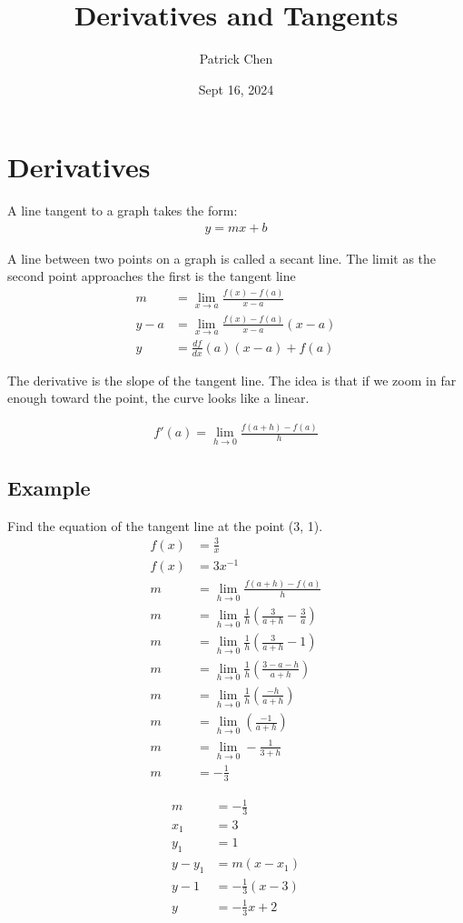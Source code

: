 \documentclass{article}
\title{Derivatives and Tangents}
\author{Patrick Chen}
\date{Sept 16, 2024}
\theoremstyle{mytheoremstyle}
\theoremstyle{mytheoremstyle}
\theoremstyle{myproblemstyle}
\begin{document}
    \maketitle
    \section*{Derivatives}
    A line tangent to a graph takes the form:
    \begin{align*}
        y = mx + b
    \end{align*}

    A line between two points on a graph is called a secant line. The limit as
    the second point approaches the first is the tangent line
    \begin{align*}
        m   &= \lim_{x\to a} \frac{f(x)-f(a)}{x-a} \\
        y-a &= \lim_{x\to a} \frac{f(x)-f(a)}{x-a} (x-a) \\
        y   &= \frac{df}{dx} (a) (x-a) + f(a)
    \end{align*}

    The derivative is the slope of the tangent line. The idea is that if we zoom
    in far enough toward the point, the curve looks like a linear.

    \begin{align*}
        f'(a)=\lim_{h\to 0} \frac{f(a+h) - f(a)}{h}
    \end{align*}

    \subsection*{Example}
    Find the equation of the tangent line at the point (3, 1).
    \begin{align*}
        f(x) &= \frac{3}{x} \\
        f(x) &= 3x^{-1} \\
        m &= \lim_{h\to 0} \frac{f(a+h) - f(a)}{h} \\
        m &= \lim_{h\to 0} \frac{1}{h} (\frac{3}{a+h}-\frac{3}{a}) \\
        m &= \lim_{h\to 0} \frac{1}{h} (\frac{3}{a+h}-1) \\
        m &= \lim_{h\to 0} \frac{1}{h} (\frac{3 - a - h}{a+h}) \\
        m &= \lim_{h\to 0} \frac{1}{h} (\frac{- h}{a+h}) \\
        m &= \lim_{h\to 0} (\frac{- 1}{a+h}) \\
        m &= \lim_{h\to 0} -\frac{1}{3+h} \\
        m &= -\frac{1}{3}
    \end{align*}

    \begin{align*}
        m   &= -\frac{1}{3} \\
        x_1 &= 3 \\
        y_1 &= 1 \\
        y-y_1 &= m(x-x_1) \\
        y-1 &= -\frac{1}{3} (x-3) \\
        y   &= -\frac{1}{3} x + 2
    \end{align*}
\end{document}
